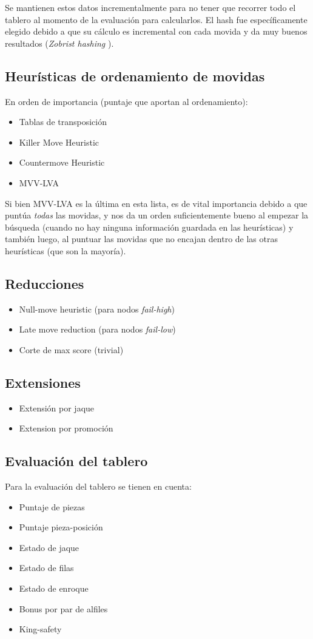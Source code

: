 \documentclass{article}
\begin{document}
Se mantienen estos datos incrementalmente para no tener que recorrer
todo el tablero al momento de la evaluación para calcularlos. El hash
fue específicamente elegido debido a que su cálculo es incremental
con cada movida y da muy buenos resultados (\emph{Zobrist hashing}
\cite{zobrist}).

\subsection{Heurísticas de ordenamiento de movidas}
En orden de importancia (puntaje que aportan al ordenamiento):
\begin{itemize}
\item Tablas de transposición
\item Killer Move Heuristic
\item Countermove Heuristic
\item MVV-LVA
\end{itemize}

Si bien MVV-LVA es la última en esta lista, es de vital importancia
debido a que puntúa \emph{todas} las movidas, y nos da un orden
suficientemente bueno al empezar la búsqueda (cuando no hay ninguna
información guardada en las heurísticas) y también luego, al puntuar
las movidas que no encajan dentro de las otras heurísticas (que son la
mayoría).

\subsection{Reducciones}

\begin{itemize}
\item Null-move heuristic (para nodos \emph{fail-high})
\item Late move reduction (para nodos \emph{fail-low})
\item Corte de max score (trivial)
\end{itemize}

\subsection{Extensiones}
\begin{itemize}
\item Extensión por jaque
\item Extension por promoción
\end{itemize}

\subsection{Evaluación del tablero}
Para la evaluación del tablero se tienen en cuenta:
\begin{itemize}
\item Puntaje de piezas
\item Puntaje pieza-posición
\item Estado de jaque
\item Estado de filas
\item Estado de enroque
\item Bonus por par de alfiles
\item King-safety
\end{itemize}
\end{document}
